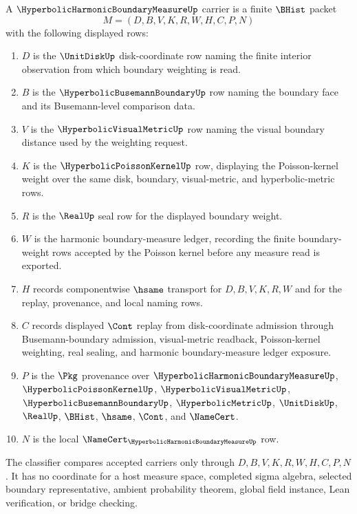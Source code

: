 \begin{definition}
\label{def:hyperbolic-harmonic-boundary-measure-carrier}
A $\HyperbolicHarmonicBoundaryMeasureUp$ carrier is a finite $\BHist$ packet
$$
M=(D,B,V,K,R,W,H,C,P,N)
$$
with the following displayed rows:
\begin{enumerate}
\item $D$ is the $\UnitDiskUp$ disk-coordinate row naming the finite interior observation from which boundary weighting is read.
\item $B$ is the $\HyperbolicBusemannBoundaryUp$ row naming the boundary face and its Busemann-level comparison data.
\item $V$ is the $\HyperbolicVisualMetricUp$ row naming the visual boundary distance used by the weighting request.
\item $K$ is the $\HyperbolicPoissonKernelUp$ row, displaying the Poisson-kernel weight over the same disk, boundary, visual-metric, and hyperbolic-metric rows.
\item $R$ is the $\RealUp$ seal row for the displayed boundary weight.
\item $W$ is the harmonic boundary-measure ledger, recording the finite boundary-weight rows accepted by the Poisson kernel before any measure read is exported.
\item $H$ records componentwise $\hsame$ transport for $D,B,V,K,R,W$ and for the replay, provenance, and local naming rows.
\item $C$ records displayed $\Cont$ replay from disk-coordinate admission through Busemann-boundary admission, visual-metric readback, Poisson-kernel weighting, real sealing, and harmonic boundary-measure ledger exposure.
\item $P$ is the $\Pkg$ provenance over $\HyperbolicHarmonicBoundaryMeasureUp$, $\HyperbolicPoissonKernelUp$, $\HyperbolicVisualMetricUp$, $\HyperbolicBusemannBoundaryUp$, $\HyperbolicMetricUp$, $\UnitDiskUp$, $\RealUp$, $\BHist$, $\hsame$, $\Cont$, and $\NameCert$.
\item $N$ is the local $\NameCert_{\HyperbolicHarmonicBoundaryMeasureUp}$ row.
\end{enumerate}
The classifier compares accepted carriers only through $D,B,V,K,R,W,H,C,P,N$. It has no coordinate for a host measure space, completed sigma algebra, selected boundary representative, ambient probability theorem, global field instance, Lean verification, or bridge checking.
\end{definition}


